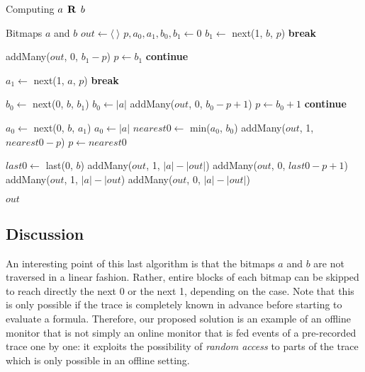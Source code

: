 \begin{algorithm}
\caption{Computing $a \mathrel{\mbox{\,\textbf{R}}}\, b$}
\label{alg:release}
\begin{multicols}{2}
\begin{algorithmic}[1]
\Require Bitmaps $a$ and $b$
\State $out \gets \langle~\rangle$
\State $p, a_0, a_1, b_0, b_1 \gets 0$
    \State $b_1 \gets$ next(1, $b$, $p$)
  \EndIf
    \State \textbf{break}
  \EndIf

    \State addMany($out$, 0, $b_1 - p$)
    \State $p \gets b_1$
    \State \textbf{continue}
  \EndIf

    \State $a_1 \gets$ next(1, $a$, $p$)
  \EndIf
    \State \textbf{break}
  \EndIf

    \State $b_0 \gets$ next(0, $b$, $b_1$)
      \State $b_0 \gets |a|$
    \EndIf
  \EndIf
    \State addMany($out$, 0, $b_0 - p + 1$)
    \State $p \gets b_0 + 1$
    \State \textbf{continue}
  \EndIf

    \State $a_0 \gets$ next(0, $b$, $a_1$)
      \State $a_0 \gets |a|$
    \EndIf
  \EndIf
  \State $nearest0 \gets$ min($a_0$, $b_0$)
  \State addMany($out$, 1, $nearest0 - p$)
  \State $p \gets nearest0$
\EndWhile

  \State $last0 \gets$ last(0, $b$)
    \State addMany($out$, 1, $|a| - |out|$)
  \Else
    \State addMany($out$, 0, $last0 - p + 1$)
    \State addMany($out$, 1, $|a| - |out$)
  \EndIf
\Else
  \State addMany($out$, 0, $|a| - |out|$)
\EndIf

\State \Return $out$
\end{algorithmic}
\end{multicols}
\end{algorithm}

\subsection{Discussion}

An interesting point of this last algorithm is that the bitmaps $a$ and $b$ are not traversed in a linear fashion. Rather, entire blocks of each bitmap can be skipped to reach directly the next 0 or the next 1, depending on the case. Note that this is only possible if the trace is completely known in advance before starting to evaluate a formula. Therefore, our proposed solution is an example of an offline monitor that is not simply an online monitor that is fed events of a pre-recorded trace one by one: it exploits the possibility of \emph{random access} to parts of the trace which is only possible in an offline setting.

